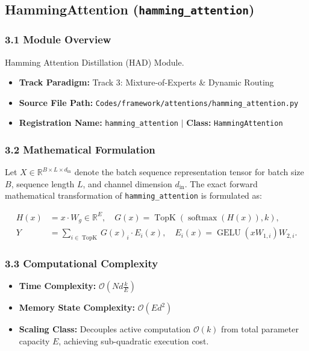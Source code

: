 \subsection{HammingAttention (\texttt{hamming\_attention})}
\label{sec:app_module_hamming_attention}

\subsubsection*{3.1 Module Overview}
Hamming Attention Distillation (HAD) Module.
\begin{itemize}
    \item \textbf{Track Paradigm:} Track 3: Mixture-of-Experts \& Dynamic Routing
    \item \textbf{Source File Path:} \texttt{Codes/framework/attentions/hamming\_attention.py}
    \item \textbf{Registration Name:} \texttt{hamming\_attention} $\mid$ \textbf{Class:} \texttt{HammingAttention}
\end{itemize}

\subsubsection*{3.2 Mathematical Formulation}
Let $X \in \mathbb{R}^{B \times L \times d_{\text{in}}}$ denote the batch sequence representation tensor for batch size $B$, sequence length $L$, and channel dimension $d_{\text{in}}$. The exact forward mathematical transformation of \texttt{hamming\_attention} is formulated as:

\begin{align}
H(x) &= x \cdot W_g \in \mathbb{R}^{E}, \quad G(x) = \operatorname{TopK}\left(\operatorname{softmax}(H(x)), k\right), \\
Y &= \sum_{i \in \operatorname{TopK}} G(x)_i \cdot E_i(x), \quad E_i(x) = \operatorname{GELU}(x W_{1, i}) W_{2, i}.
\end{align}


\subsubsection*{3.3 Computational Complexity}
\begin{itemize}
    \item \textbf{Time Complexity:} $\mathcal{O}(N d \frac{k}{E})$
    \item \textbf{Memory State Complexity:} $\mathcal{O}(E d^2)$
    \item \textbf{Scaling Class:} Decouples active computation $\mathcal{O}(k)$ from total parameter capacity $E$, achieving sub-quadratic execution cost.
\end{itemize}


